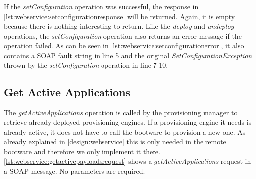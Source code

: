 \vspace*{\baselineskip}

\pagebreak


\vspace*{\baselineskip}

\pagebreak

If the \textit{setConfiguration} operation was successful, the response in \autoref{lst:webservice:setconfigurationresponse} will be returned.
Again, it is empty because there is nothing interesting to return.
Like the \textit{deploy} and \textit{undeploy} operations, the \textit{setConfiguration} operation also returns an error message if the operation failed.
As can be seen in \autoref{lst:webservice:setconfigurationerror}, it also contains a SOAP fault string in line 5 and the original \textit{SetConfigurationException} thrown by the \textit{setConfiguration} operation in line 7-10.

\subsection{Get Active Applications}

The \textit{getActiveApplications} operation is called by the provisioning manager to retrieve already deployed provisioning engines.
If a provisioning engine it needs is already active, it does not have to call the bootware to provision a new one.
As already explained in \autoref{design:webservice} this is only needed in the remote bootware and therefore we only implement it there.
\autoref{lst:webservice:getactivepayloadsrequest} shows a \textit{getActiveApplications} request in a SOAP message.
No parameters are required.

